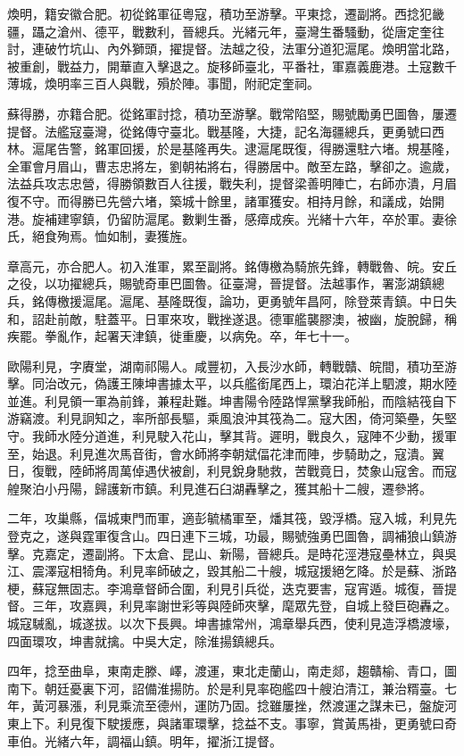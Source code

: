 \begin{pinyinscope}
煥明，籍安徽合肥。初從銘軍征粵寇，積功至游擊。平東捻，遷副將。西捻犯畿疆，躡之滄州、德平，戰數利，晉總兵。光緒元年，臺灣生番騷動，從唐定奎往討，連破竹坑山、內外獅頭，擢提督。法越之役，法軍分道犯滬尾。煥明當北路，被重創，戰益力，開華直入擊退之。旋移師臺北，平番社，軍嘉義鹿港。土寇數千薄城，煥明率三百人與戰，殞於陣。事聞，附祀定奎祠。

蘇得勝，亦籍合肥。從銘軍討捻，積功至游擊。戰常陷堅，賜號勵勇巴圖魯，屢遷提督。法艦寇臺灣，從銘傳守臺北。戰基隆，大捷，記名海疆總兵，更勇號曰西林。滬尾告警，銘軍回援，於是基隆再失。逮滬尾既復，得勝還駐六堵。規基隆，全軍會月眉山，曹志忠將左，劉朝祐將右，得勝居中。敵至左路，擊卻之。逾歲，法益兵攻志忠營，得勝領數百人往援，戰失利，提督梁善明陣亡，右師亦潰，月眉復不守。而得勝已先營六堵，築城十餘里，諸軍獲安。相持月餘，和議成，始開港。旋補建寧鎮，仍留防滬尾。數剿生番，感瘴成疾。光緒十六年，卒於軍。妻徐氏，絕食殉焉。恤如制，妻獲旌。

章高元，亦合肥人。初入淮軍，累至副將。銘傳檄為騎旅先鋒，轉戰魯、皖。安丘之役，以功擢總兵，賜號奇車巴圖魯。征臺灣，晉提督。法越事作，署澎湖鎮總兵，銘傳檄援滬尾。滬尾、基隆既復，論功，更勇號年昌阿，除登萊青鎮。中日失和，詔赴前敵，駐蓋平。日軍來攻，戰挫遂退。德軍艦襲膠澳，被幽，旋脫歸，稱疾罷。拳亂作，起署天津鎮，徙重慶，以病免。卒，年七十一。

歐陽利見，字賡堂，湖南祁陽人。咸豐初，入長沙水師，轉戰贛、皖間，積功至游擊。同治改元，偽護王陳坤書據太平，以兵艦銜尾西上，環泊花洋上駟渡，期水陸並進。利見領一軍為前鋒，兼程赴難。坤書陽令陸路悍黨擊我師船，而陰結筏自下游竊渡。利見詗知之，率所部長驅，乘風浪沖其筏為二。寇大困，倚河築壘，矢堅守。我師水陸分道進，利見駛入花山，擊其背。遲明，戰良久，寇陣不少動，援軍至，始退。利見進次馬音街，會水師將李朝斌偪花津而陣，步騎助之，寇潰。翼日，復戰，陸師將周萬倬遇伏被創，利見銳身馳救，苦戰竟日，焚象山寇舍。而寇艎聚泊小丹陽，歸護新市鎮。利見進石臼湖轟擊之，獲其船十二艘，遷參將。

二年，攻巢縣，偪城東門而軍，適彭毓橘軍至，燔其筏，毀浮橋。寇入城，利見先登克之，遂與霆軍復含山。四日連下三城，功最，賜號強勇巴圖魯，調補狼山鎮游擊。克嘉定，遷副將。下太倉、昆山、新陽，晉總兵。是時花涇港寇壘林立，與吳江、震澤寇相犄角。利見率師破之，毀其船二十艘，城寇援絕乞降。於是蘇、浙路梗，蘇寇無固志。李鴻章督師合圍，利見引兵從，迭克要害，寇宵遁。城復，晉提督。三年，攻嘉興，利見率謝世彩等與陸師夾擊，麾眾先登，自城上發巨砲轟之。城寇駴亂，城遂拔。以次下長興。坤書據常州，鴻章舉兵西，使利見造浮橋渡壕，四面環攻，坤書就擒。中吳大定，除淮揚鎮總兵。

四年，捻至曲阜，東南走滕、嶧，渡運，東北走蘭山，南走郯，趨贛榆、青口，圖南下。朝廷憂裏下河，詔備淮揚防。於是利見率砲艦四十艘泊清江，兼治糈臺。七年，黃河暴漲，利見乘流至德州，運防乃固。捻雖屢挫，然渡運之謀未已，盤旋河東上下。利見復下駛援應，與諸軍環擊，捻益不支。事寧，賞黃馬褂，更勇號曰奇車伯。光緒六年，調福山鎮。明年，擢浙江提督。


\end{pinyinscope}
